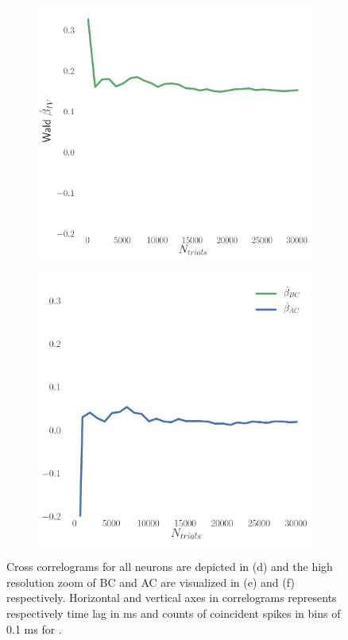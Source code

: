 \documentclass[11pt]{article}
\begin{document}
\begin{figure}
\medskip
\begin{subfigure}{0.485\textwidth} \includegraphics[scale=.25]{wald_BC}
\caption{} \label{fig:cchvswald:3}
\end{subfigure}\hfill
\begin{subfigure}{0.485\textwidth} \includegraphics[scale=.25]{wald_AC}
\caption{} \label{fig:cchvswald:4}
\end{subfigure}
\caption{Cross correlograms for all neurons are depicted in (d) and the high resolution zoom of BC and AC are visualized in (e) and (f) respectively. Horizontal and vertical axes in correlograms represents respectively time lag in ms and counts of coincident spikes in bins of 0.1 ms for . \label{fig:cchvswald}}
\end{figure}
\end{document}
